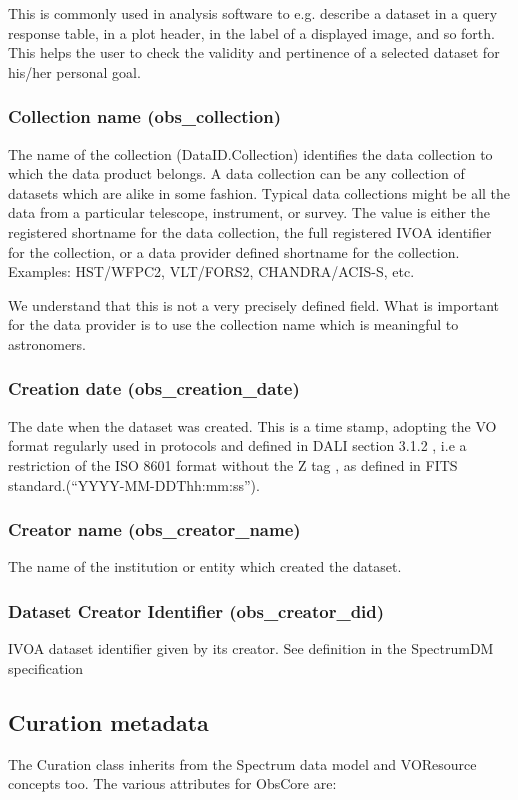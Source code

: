 \documentclass[11pt,a4paper]{ivoa}
\begin{document}
This is commonly used in analysis software to e.g. describe a dataset in a query response table, in a plot header, in
the label of a displayed image, and so forth. This helps the user to check the validity and pertinence of a selected
dataset for his/her personal goal.

\subsubsection{Collection name (obs\_collection)}
The name of the collection (DataID.Collection) identifies the data collection to which the data product belongs.  A data
collection can be any collection of datasets which are alike in some fashion.  Typical data collections might be all
the data from a particular telescope, instrument, or survey. The value is either the registered shortname for the data
collection, the full registered IVOA identifier for the collection, or a data provider defined shortname for the
collection. Examples: HST/WFPC2, VLT/FORS2, CHANDRA/ACIS-S, etc.

We understand that this is not a very precisely defined field. What is important for the data provider is to use the
collection name which is meaningful to astronomers.

\subsubsection{Creation date (obs\_creation\_date)}
The date when the dataset was created. This is a time stamp, adopting the VO format regularly used in protocols and
defined in DALI \citep{2013ivoa.spec.1129D} section 3.1.2 , i.e a restriction of the ISO 8601 format without the Z tag ,
as defined in FITS standard.(``YYYY-MM-DDThh:mm:ss'').

\subsubsection{Creator name (obs\_creator\_name)}
The name of the institution or entity which created the dataset.

\subsubsection{Dataset  Creator Identifier (obs\_creator\_did)}
IVOA dataset identifier given by its creator. See definition in the SpectrumDM specification \citep{2007ivoa.spec.1029M}

\subsection{Curation metadata}
The Curation class inherits from the Spectrum data model and VOResource concepts too.  The various attributes for
ObsCore are:
\end{document}
